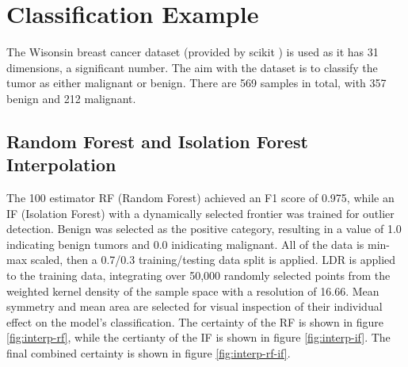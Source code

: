 \documentclass[a4paper, twocolumn]{article}
\begin{document}
\section{Classification Example}

The Wisonsin breast cancer dataset \cite{breastcancer} (provided by scikit \cite{pedregosa2011scikit}) is used as it has 31 dimensions, a significant number. The aim with the dataset is to classify the tumor as either malignant or benign. There are 569 samples in total, with 357 benign and 212 malignant.

\subsection{Random Forest and Isolation Forest Interpolation}

The 100 estimator RF (Random Forest) \cite{liaw2002classification} achieved an F1 score of 0.975, while an IF (Isolation Forest) \cite{liu2008isolation} with a dynamically selected frontier was trained for outlier detection. Benign was selected as the positive category, resulting in a value of 1.0 indicating benign tumors and 0.0 inidicating malignant. All of the data is min-max scaled, then a 0.7/0.3 training/testing data split is applied. LDR is applied to the training data, integrating over 50,000 randomly selected points from the weighted kernel density of the sample space with a resolution of 16.66. Mean symmetry and mean area are selected for visual inspection of their individual effect on the model's classification. The certainty of the RF is shown in figure \ref{fig:interp-rf}, while the certianty of the IF is shown in figure \ref{fig:interp-if}. The final combined certainty is shown in figure \ref{fig:interp-rf-if}.
\end{document}
